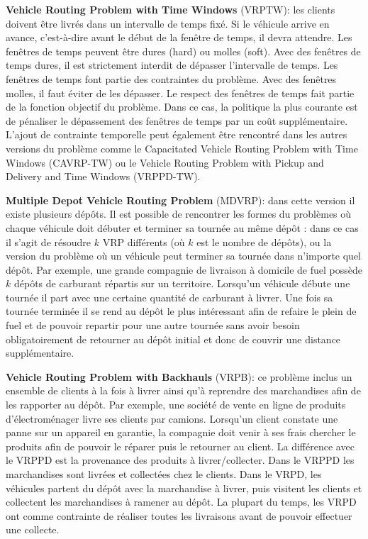 \begin{list}{-}{\leftmargin=2em}
  
  \item \textbf{Vehicle Routing Problem with Time Windows} (VRPTW): les clients doivent être livrés dans un intervalle de temps fixé. Si le véhicule arrive en avance, c'est-à-dire avant le début de la fenêtre de temps, il devra attendre. Les fenêtres de temps peuvent être dures (hard) ou molles (soft). Avec des fenêtres de temps dures, il est strictement interdit de dépasser l'intervalle de temps. Les fenêtres de temps font partie des contraintes du problème. Avec des fenêtres molles, il faut éviter de les dépasser. Le respect des fenêtres de temps fait partie de la fonction objectif du problème. Dans ce cas, la politique la plus courante est de pénaliser le dépassement des fenêtres de temps par un coût supplémentaire. L'ajout de contrainte temporelle peut également être rencontré dans les autres versions du problème comme le Capacitated Vehicle Routing Problem with Time Windows (CAVRP-TW) ou le Vehicle Routing Problem with Pickup and Delivery and Time Windows (VRPPD-TW).
  
  \item \textbf{Multiple Depot Vehicle Routing Problem} (MDVRP): dans cette version il existe plusieurs dépôts. Il est possible de rencontrer les formes du problèmes où chaque véhicule doit débuter et terminer sa tournée au même dépôt : dans ce cas il s'agit de résoudre $k$ VRP différents (où $k$ est le nombre de dépôts), ou la version du problème où un véhicule peut terminer sa tournée dans n'importe quel dépôt. Par exemple, une grande compagnie de livraison à domicile de fuel possède $k$ dépôts de carburant répartis sur un territoire. Lorsqu'un véhicule débute une tournée il part avec une certaine quantité de carburant à livrer. Une fois sa tournée terminée il se rend au dépôt le plus intéressant afin de refaire le plein de fuel et de pouvoir repartir pour une autre tournée sans avoir besoin obligatoirement de retourner au dépôt initial et donc de couvrir une distance supplémentaire.
  
  \item \textbf{Vehicle Routing Problem with Backhauls} (VRPB): ce problème inclus un ensemble de clients à la fois à livrer ainsi qu'à reprendre des marchandises afin de les rapporter au dépôt. Par exemple, une société de vente en ligne de produits d'électroménager livre ses clients par camions. Lorsqu'un client constate une panne sur un appareil en garantie, la compagnie doit venir à ses frais chercher le produits afin de pouvoir le réparer 
  puis le retourner au client. La différence avec le VRPPD est la provenance des produits à livrer/collecter. Dans le VRPPD les marchandises sont livrées et collectées chez le clients. Dans le VRPD, les véhicules partent du dépôt avec la marchandise à livrer, puis visitent les clients et collectent les marchandises à ramener au dépôt. La plupart du temps, les VRPD ont comme contrainte de réaliser toutes les livraisons avant de pouvoir effectuer une collecte.
  

\end{list}

